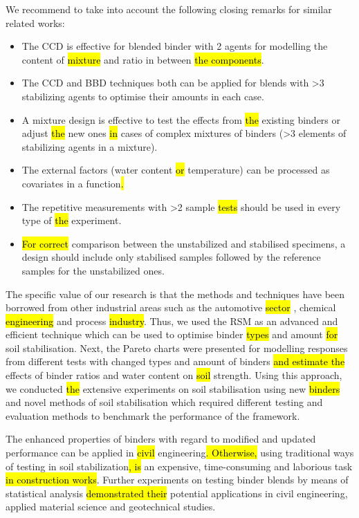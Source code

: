 \documentclass[eprint,
]{actapoly}
\begin{document}
We recommend to take into account the following closing remarks for similar related works:
\begin{itemize}
	\item The CCD is effective for blended binder with 2 agents for modelling the content of \hl{mixture }and ratio in between\hl{ the components}.
	\item The CCD and BBD techniques both can be applied for blends with >3 stabilizing agents to optimise their amounts in each case.
	\item A mixture design is effective to test the effects from \hl{the }existing binders or adjust \hl{the }new ones \hl{in }cases of complex mixtures of binders (>3 elements of stabilizing agents in a mixture).
	\item The external factors (water content \hl{or} temperature)\hl{ }can be processed as covariates in a function\hl{.}
	\item The repetitive measurements with >2 sample \hl{tests} should be used in every type of \hl{the }experiment.
	\item \hl{For correct }comparison between the unstabilized and stabilised specimens, a design should include only stabilised samples followed by the reference samples for the unstabilized ones.
\end{itemize}

The specific value of our research is that the methods and techniques have been borrowed from other industrial areas such as the automotive\hl{ sector} , chemical\hl{ engineering }and process \hl{industry}. Thus, we used the RSM as an advanced and efficient technique which can be used to optimise binder \hl{types} and amount \hl{for }soil stabilisation. Next, the Pareto charts were presented for modelling responses from different tests with changed types and amount of binders \hl{and estimate the }effects of binder ratios and water content on \hl{soil} strength. Using this approach, we\hl{ }conducted \hl{the }extensive experiments on soil stabilisation using new \hl{binders }and novel methods of soil stabilisation which required different testing and evaluation methods\hl{ }to benchmark the performance of the framework. 

The enhanced properties of binders with regard to modified and updated performance can be applied in \hl{civil }engineering\hl{. Otherwise, }using traditional ways of testing in soil stabilization\hl{, is }an expensive, time-consuming and laborious task \hl{in construction works}. Further experiments on testing binder blends by\hl{ }means of statistical analysis \hl{demonstrated their }potential applications in civil engineering, applied material science and geotechnical studies. 
\end{document}
